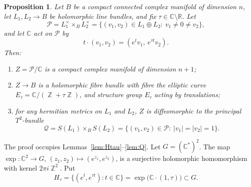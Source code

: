 \documentclass{article}
\DeclareMathOperator{\Z}{\mathbb{Z}}
\newtheorem{proposition}[theorem]{Proposition}
\theoremstyle{definition}
\theoremstyle{plain}
\newcommand{\R}{\mathbb{R}}
\newcommand{\C}{\mathbb{C}}
\begin{document}
\begin{proposition}\label{prop:CE}
Let $B$ be a compact connected complex manifold of dimension $n$, let $L_1,L_2\to B$ be
holomorphic line bundles, and fix $\tau\in\C\setminus\R$. Let
\[
\mathcal P=L_1^\times\times_BL_2^\times=\{(v_1,v_2)\in L_1\oplus L_2:\ v_1\neq0\neq v_2\},
\]
and let $\C$ act on $\mathcal P$ by
\[
t\cdot(v_1,v_2)=(e^{t}v_1,\ e^{\tau t}v_2).
\]
Then:
\begin{enumerate}
\item $Z=\mathcal P/\C$ is a compact complex manifold of dimension $n+1$;
\item $Z\to B$ is a holomorphic fibre bundle with fibre the elliptic curve
  $E_\tau=\C/(\Z+\tau\Z)$, and structure group $E_\tau$ acting by translations;
\item for any hermitian metrics on $L_1$ and $L_2$, $Z$ is diffeomorphic to the
  principal $T^2$-bundle
  \[\mathcal Q=S(L_1)\times_BS(L_2)=\{(v_1,v_2)\in\mathcal P:\ |v_1|=|v_2|=1\}.\]
\end{enumerate}
\end{proposition}

The proof occupies Lemmas~\ref{lem:Htau}--\ref{lem:Q}. Let $G=(\C^*)^2$. The map
$\exp\colon\C^2\to G$, $(z_1,z_2)\mapsto(e^{z_1},e^{z_2})$, is a surjective holomorphic
homomorphism with kernel $2\pi i\Z^2$. Put
\[H_\tau=\{(e^t,e^{\tau t}):t\in\C\}=\exp\big(\C\cdot(1,\tau)\big)\subset G.\]
\end{document}
